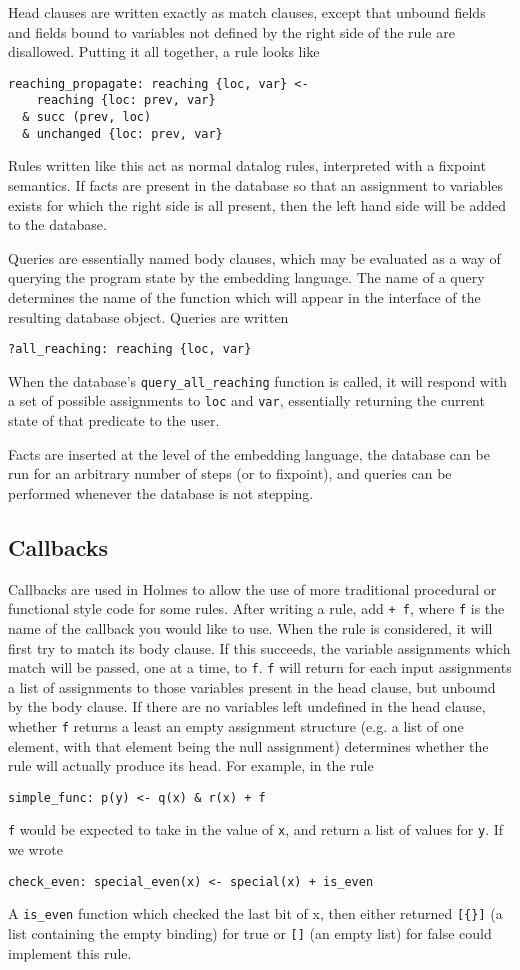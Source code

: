 Head clauses are written exactly as match clauses, except that unbound fields and fields bound to variables not defined by the right side of the rule are disallowed.
Putting it all together, a rule looks like
\begin{verbatim}
reaching_propagate: reaching {loc, var} <-
    reaching {loc: prev, var}
  & succ (prev, loc)
  & unchanged {loc: prev, var}
\end{verbatim}
Rules written like this act as normal datalog rules, interpreted with a fixpoint semantics.
If facts are present in the database so that an assignment to variables exists for which the right side is all present, then the left hand side will be added to the database.

Queries are essentially named body clauses, which may be evaluated as a way of querying the program state by the embedding language.
The name of a query determines the name of the function which will appear in the interface of the resulting database object.
Queries are written
\begin{verbatim}
?all_reaching: reaching {loc, var}
\end{verbatim}
When the database's \texttt{query\_all\_reaching} function is called, it will respond with a set of possible assignments to \texttt{loc} and \texttt{var}, essentially returning the current state of that predicate to the user.

Facts are inserted at the level of the embedding language, the database can be run for an arbitrary number of steps (or to fixpoint), and queries can be performed whenever the database is not stepping.

\subsection{Callbacks}
Callbacks are used in Holmes to allow the use of more traditional procedural or functional style code for some rules.
After writing a rule, add \texttt{+ f}, where \texttt{f} is the name of the callback you would like to use.
When the rule is considered, it will first try to match its body clause.
If this succeeds, the variable assignments which match will be passed, one at a time, to \texttt{f}.
\texttt{f} will return for each input assignments a list of assignments to those variables present in the head clause, but unbound by the body clause.
If there are no variables left undefined in the head clause, whether \texttt{f} returns a least an empty assignment structure (e.g. a list of one element, with that element being the null assignment) determines whether the rule will actually produce its head.
For example, in the rule
\begin{verbatim}
simple_func: p(y) <- q(x) & r(x) + f
\end{verbatim}
\texttt{f} would be expected to take in the value of \texttt{x}, and return a list of values for \texttt{y}.
If we wrote
\begin{verbatim}
check_even: special_even(x) <- special(x) + is_even
\end{verbatim}
A \texttt{is_even} function which checked the last bit of x, then either returned \texttt{[\{\}]} (a list containing the empty binding) for true or \texttt{[]} (an empty list) for false could implement this rule.

